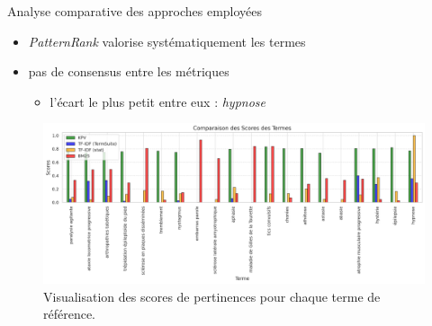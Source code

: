 \begin{frame}{Analyse comparative des approches employées}
	\begin{itemize}
		\item \textit{PatternRank} valorise systématiquement les termes
		\item pas de consensus entre les métriques
		\begin{itemize}
			\item l'écart le plus petit entre eux : \textit{hypnose}
		\end{itemize}
	\end{itemize}
	\begin{figure}[h]
		\includegraphics[width=\linewidth]{pic/termes_viz.png}
		\caption{Visualisation des scores de pertinences pour chaque terme de référence.}
		\label{fig:ling_out_TAL}
	\end{figure}
\end{frame}

%

